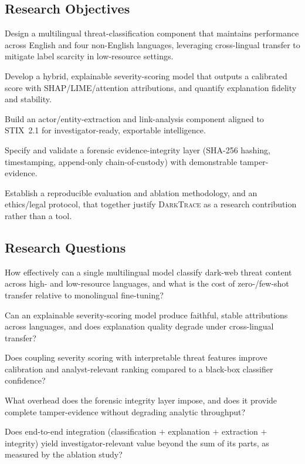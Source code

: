 \documentclass[11pt,a4paper]{article}
\newcommand{\framework}{\textsc{DarkTrace}}
\begin{document}
\subsection{Research Objectives}
\begin{description}[leftmargin=2.4em,style=nextline]
  \item[O1] Design a multilingual threat-classification component that maintains
  performance across English and four non-English languages, leveraging cross-lingual
  transfer to mitigate label scarcity in low-resource settings.
  \item[O2] Develop a hybrid, explainable severity-scoring model that outputs a
  calibrated score with SHAP/LIME/attention attributions, and quantify explanation
  fidelity and stability.
  \item[O3] Build an actor/entity-extraction and link-analysis component aligned to
  STIX~2.1 for investigator-ready, exportable intelligence.
  \item[O4] Specify and validate a forensic evidence-integrity layer (SHA-256 hashing,
  timestamping, append-only chain-of-custody) with demonstrable tamper-evidence.
  \item[O5] Establish a reproducible evaluation and ablation methodology, and an
  ethics/legal protocol, that together justify \framework{} as a research contribution
  rather than a tool.
\end{description}

\subsection{Research Questions}
\begin{description}[leftmargin=2.8em,style=nextline]
  \item[RQ1] How effectively can a single multilingual model classify dark-web threat
  content across high- and low-resource languages, and what is the cost of zero-/few-shot
  transfer relative to monolingual fine-tuning?
  \item[RQ2] Can an explainable severity-scoring model produce faithful, stable
  attributions across languages, and does explanation quality degrade under
  cross-lingual transfer?
  \item[RQ3] Does coupling severity scoring with interpretable threat features improve
  calibration and analyst-relevant ranking compared to a black-box classifier
  confidence?
  \item[RQ4] What overhead does the forensic integrity layer impose, and does it
  provide complete tamper-evidence without degrading analytic throughput?
  \item[RQ5] Does end-to-end integration (classification $+$ explanation $+$ extraction
  $+$ integrity) yield investigator-relevant value beyond the sum of its parts, as
  measured by the ablation study?
\end{description}
\end{document}
